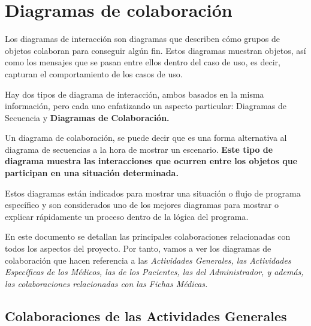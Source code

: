 \section{Diagramas de colaboración} %
\label{sec:diagramas_de_colaboracion}

	Los diagramas de interacción son diagramas que describen cómo grupos de objetos colaboran para conseguir algún fin. Estos diagramas muestran objetos, así como los mensajes que se pasan entre ellos dentro del caso de uso, es decir, capturan el comportamiento de los casos de uso.
	
	Hay dos tipos de diagrama de interacción, ambos basados en la misma información, pero cada uno enfatizando un aspecto particular: Diagramas de Secuencia y \textbf{Diagramas de Colaboración.}

	Un diagrama de colaboración, se puede decir que es una forma alternativa al diagrama de secuencias a la hora de mostrar un escenario. \textbf{Este tipo de diagrama muestra las interacciones que ocurren entre los objetos que participan en una situación determinada.}

	\medskip
	
	
	\medskip
		
	Estos diagramas están indicados para mostrar una situación o flujo de programa específico y son considerados uno de los mejores diagramas para mostrar o explicar rápidamente un proceso dentro de la lógica del programa.
	
	En este documento se detallan las principales colaboraciones relacionadas con todos los aspectos del proyecto. Por tanto, vamos a ver los diagramas de colaboración que hacen referencia a las \textit{Actividades Generales, las Actividades Específicas de los Médicos, las de los Pacientes, las del Administrador, y además, las colaboraciones relacionadas con las Fichas Médicas.}
	
	\subsection{Colaboraciones de las Actividades Generales} %
	\label{sub:colaboraciones_de_las_actividades_generales}
	
